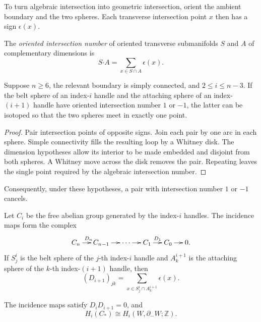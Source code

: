 To turn algebraic intersection into geometric
intersection, orient the ambient boundary and
the two spheres.  Each transverse
intersection point $x$ then has a sign
$\epsilon(x)$.

\begin{definition}
\label{at-definition-oriented-intersection}
The \emph{oriented intersection number} of
oriented transverse submanifolds $S$ and $A$
of complementary dimensions is
$$
S\mathbin{\boldsymbol{\cdot}}A
=\sum_{x\in S\cap A}\epsilon(x).
$$
\end{definition}

\begin{lemma}
\label{at-lemma-whitney-handle-trick}
Suppose $n\geq6$, the relevant boundary is
simply connected, and
$2\leq i\leq n-3$.  If the belt sphere of an
index-$i$ handle and the attaching sphere of
an index-$(i+1)$ handle have oriented
intersection number $1$ or $-1$, the latter
can be isotoped so that the two spheres meet
in exactly one point.
\end{lemma}

\begin{proof}
Pair intersection points of opposite signs.
Join each pair by one arc in each sphere.
Simple connectivity fills the resulting loop
by a Whitney disk.  The dimension hypotheses
allow its interior to be made embedded and
disjoint from both spheres.  A Whitney move
across the disk removes the pair.  Repeating
leaves the single point required by the
algebraic intersection number.
\end{proof}

Consequently, under these hypotheses, a pair
with intersection number $1$ or $-1$
cancels.

Let $C_i$ be the free abelian group generated
by the index-$i$ handles.  The incidence maps
form the complex
$$
\xymatrix@C=12pt{
C_n\ar[r]^{D_n}&C_{n-1}\ar[r]&\cdots
\ar[r]&C_1\ar[r]^{D_1}&C_0\ar[r]&0.
}
$$
If $S_j^i$ is the belt sphere of the
$j$-th index-$i$ handle and $A_k^{i+1}$ is
the attaching sphere of the $k$-th
index-$(i+1)$ handle, then
$$
(D_{i+1})_{jk}
=\sum_{x\in S_j^i\cap A_k^{i+1}}
\epsilon(x).
$$


\begin{proposition}
\label{at-proposition-handle-chain-complex}
The incidence maps satisfy
$D_iD_{i+1}=0$, and
$$
H_i(C_*)\cong H_i(W,\partial_-W;
\mathbb{Z}).
$$
\end{proposition}

